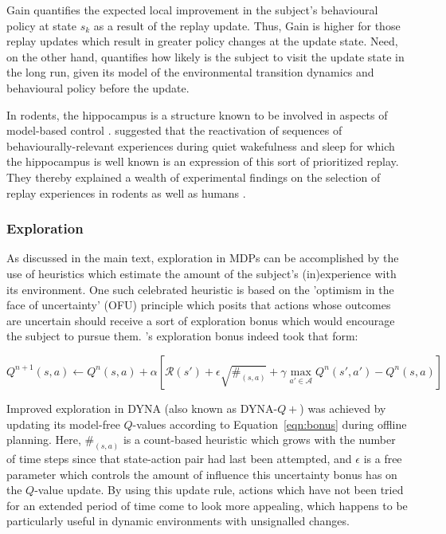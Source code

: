 Gain quantifies the expected local improvement in the subject's behavioural policy at state $s_k$ as a result of the replay update. Thus, Gain is higher for those replay updates which result in greater policy changes at the update state. Need, on the other hand, quantifies how likely is the subject to visit the update state in the long run, given its model of the environmental transition dynamics and behavioural policy before the update.

In rodents, the hippocampus is a structure known to be involved in aspects of model-based control \parencite{pfeifferHippocampalPlacecellSequences2013, ambroseReverseReplayHippocampal2016, cazeHippocampalReplaysScrutiny2018}. \textcite{mattarPrioritizedMemoryAccess2018} suggested that the reactivation of sequences of behaviourally-relevant experiences during quiet wakefulness and sleep for which the hippocampus is well known \parencite{fosterReplayComesAge2017} is an expression of this sort of prioritized replay. They thereby explained a wealth of experimental findings on the selection of replay experiences in rodents \parencite{ambroseReverseReplayHippocampal2016, pfeifferHippocampalPlacecellSequences2013} as well as humans \parencite{liuPrioritizedExperienceReplay2022, antonovOptimismPessimismOptimised2022}. 

\subsubsection*{Exploration}

As discussed in the main text, exploration in MDPs can be accomplished by the use of heuristics which estimate the amount of the subject's (in)experience with its environment. One such celebrated heuristic is based on the 'optimism in the face of uncertainty' (OFU) principle which posits that actions whose outcomes are uncertain should receive a sort of exploration bonus which would encourage the subject to pursue them. \textcite{suttonDynaIntegratedArchitecture1991}'s exploration bonus indeed took that form:

\begin{equation}
    Q^{n+1}(s,a) \leftarrow Q^n(s,a) + \alpha \left[ \mathcal{R}(s') + \epsilon \sqrt{\#_{(s,a)}} + \gamma \max_{a'\in\mathcal{A}}Q^n(s',a') - Q^n(s,a) \right]
    \label{eqn:bonus}
\end{equation}

Improved exploration in DYNA (also known as DYNA-$Q+$) was achieved by updating its model-free $Q$-values according to Equation~\ref{eqn:bonus} during offline planning. Here, $\#_{(s,a)}$ is a count-based heuristic which grows with the number of time steps since that state-action pair had last been attempted, and $\epsilon$ is a free parameter which controls the amount of influence this uncertainty bonus has on the $Q$-value update. By using this update rule, actions which have not been tried for an extended period of time come to look more appealing, which happens to be particularly useful in dynamic environments with unsignalled changes.


